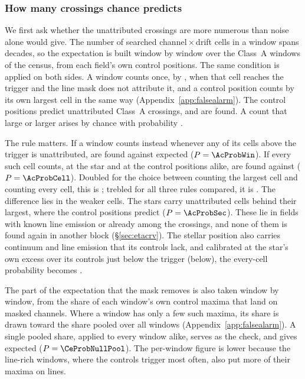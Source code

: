 \subsubsection{How many crossings chance predicts}
\label{sec:trigunif}

We first ask whether the unattributed crossings are more numerous than
noise alone would give. The number of searched channel\,$\times$\,drift
cells in a window spans \TuCellsDecades{} decades, so the expectation is
built window by window over the \CeNWin{} Class~A windows of the census,
from each field's own control positions. The same condition is applied on
both sides. A window counts once, by \AcRulePrimary, when that cell
reaches the trigger and the line mask does not attribute it, and a control
position counts by its own largest cell in the same way
(Appendix~\ref{app:falsealarm}). The control positions predict \CeExp{}
unattributed Class~A crossings, and \CeObs{} are found. A count that large
or larger arises by chance with probability \CeProbNull.

The rule matters. If a window counts instead whenever any of its cells above
the trigger is unattributed, \AcObsWin{} are found against \AcExpWin{}
expected ($P=\AcProbWin$). If every such cell counts, at the star and at
the control positions alike, \AcObsCell{} are found against \AcExpCell{}
($P=\AcProbCell$). Doubled for the choice between counting the largest cell
and counting every cell, this is \AcProbCellTwoPhrase; trebled for all three
rules compared, it is \AcProbCellThree. The difference lies in the weaker
cells. The
stars carry \AcStarSecNWord{} unattributed cells behind their largest, where
the control positions predict \AcSecExp{} ($P=\AcProbSec$). These lie in
fields with known line emission or already among the crossings, and none of
them is found again in another block (\S\ref{sec:etacrv}). The stellar
position also carries continuum and line emission that its controls lack,
and calibrated at the star's own excess over its controls just below the
trigger (below), the every-cell probability becomes \AcProbCellNear.

The part of the expectation that the mask removes is also taken window by
window, from the share of each window's own control maxima that land on
masked channels. Where a window has only a few such maxima, its share is
drawn toward the share pooled over all windows (Appendix~\ref{app:falsealarm}).
A single pooled share, applied to every window alike, serves as the check,
and gives \CeExpPool{} expected ($P=\CeProbNullPool$). The per-window figure
is \CeExpMovePool{} lower because the line-rich windows, where the controls
trigger most often, also put more of their maxima on lines.

